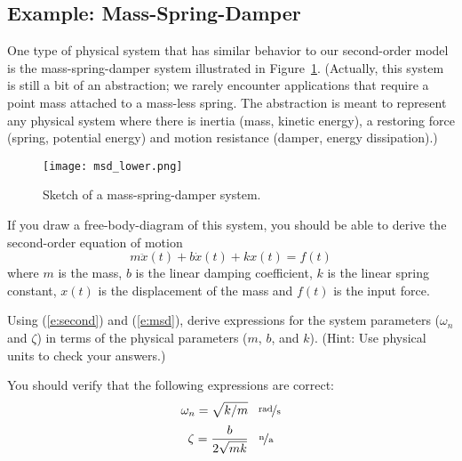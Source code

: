 \subsection{Example: Mass-Spring-Damper}
One type of physical system that has similar behavior to our second-order model is the mass-spring-damper system illustrated in Figure~\ref{f:msd2}.  (Actually, this system is still a bit of an abstraction; we rarely encounter applications that require a point mass attached to a mass-less spring.  The abstraction is meant to represent any physical system where there is inertia (mass, kinetic energy), a restoring force (spring, potential energy) and motion resistance (damper, energy dissipation).)
\begin{figure}[htb!]
\centerline{
{\texttt{[image: msd\_lower.png]}}}
\caption{Sketch of a mass-spring-damper system.}
\label{f:msd2}
\end{figure}

If you draw a free-body-diagram of this system, you should be able to derive the second-order equation of motion
\begin{equation}\label{e:msd}
m \ddot{x}(t) + b \dot{x}(t) + k x(t) = f(t)
\end{equation}
where $m$ is the mass, $b$ is the linear damping coefficient, $k$ is the linear spring constant, $x(t)$ is the displacement of the mass and $f(t)$ is the input force.

\begin{ex}
Using (\ref{e:second}) and (\ref{e:msd}), derive expressions for the system parameters ($\omega_n$ and $\zeta$) in terms of the physical parameters ($m$, $b$, and $k$).  (Hint: Use physical units to check your answers.)
\end{ex}

\begin{soln}
You should verify that the following expressions are correct:
\[ \omega_n = \sqrt{k/m} \; \; \; \unitfrac[]{rad}{s}\]
\[ \zeta = \frac{b}{2 \sqrt{mk}} \; \; \; \unitfrac[]{n}{a} \]
\end{soln}



